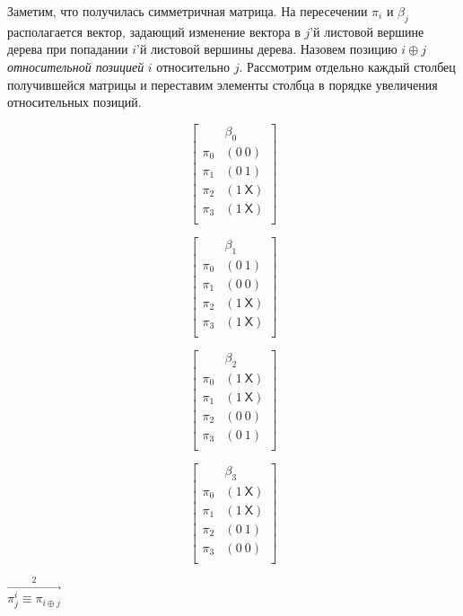 Заметим, что получилась симметричная матрица. На пересечении $\pi_i$
и $\beta_j$ располагается вектор, задающий изменение вектора в $j$'й
листовой вершине дерева при попадании $i$'й листовой вершины
дерева. Назовем позицию $i \oplus j$ \emph{относительной позицией}
$i$ относительно $j$. Рассмотрим отдельно каждый столбец
получившейся матрицы и переставим элементы столбца в порядке
увеличения относительных позиций.

\parbox{0.2\textwidth}{
$$ \left[
  \begin{array}{c|c}
          & \beta_0 \\ \hline
    \pi_0 & (0~0) \\
    \pi_1 & (0~1) \\
    \pi_2 & (1~\textsf{X}) \\
    \pi_3 & (1~\textsf{X}) \\
  \end{array}
\right]
$$
}\parbox{0.2\textwidth}{
$$ \left[
  \begin{array}{c|c}
          & \beta_1 \\ \hline
    \pi_0 & (0~1) \\
    \pi_1 & (0~0) \\
    \pi_2 & (1~\textsf{X}) \\
    \pi_3 & (1~\textsf{X}) \\
  \end{array}
\right]
$$
}\parbox{0.2\textwidth}{
$$ \left[
  \begin{array}{c|c}
          & \beta_2 \\ \hline
    \pi_0 & (1~\textsf{X}) \\
    \pi_1 & (1~\textsf{X}) \\
    \pi_2 & (0~0) \\
    \pi_3 & (0~1) \\
  \end{array}
\right]
$$
}\parbox{0.2\textwidth}{
$$ \left[
  \begin{array}{c|c}
          & \beta_3 \\ \hline
    \pi_0 & (1~\textsf{X}) \\
    \pi_1 & (1~\textsf{X}) \\
    \pi_2 & (0~1) \\
    \pi_3 & (0~0) \\
  \end{array}
\right]
$$
} $\stackrel{2}{\stackrel{\longrightarrow}{\pi^i_j \equiv \pi_{i
\oplus j}}}$

